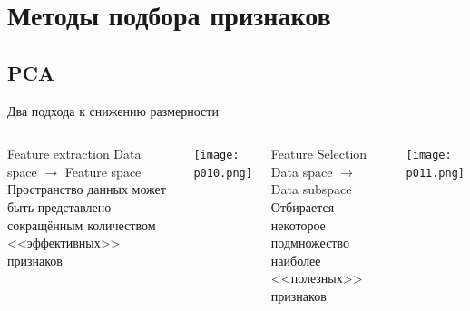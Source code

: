 \documentclass[pdf, intlimits, 9pt, unicode]{beamer}
\begin{document}

\section{Методы подбора признаков}
\subsection{PCA}



\begin{frame}{Два подхода к снижению размерности}

\begin{columns}[t] %
\begin{block}{Feature extraction}
Data space $\rightarrow$ Feature space\\
Пространство данных может быть представлено сокращённым количеством <<эффективных>> признаков
\end{block}
\texttt{[image: p010.png]}\pause

\begin{block}{Feature Selection}
Data space $\rightarrow$ Data subspace\\
Отбирается некоторое подмножество наиболее <<полезных>> признаков
\end{block}
\texttt{[image: p011.png]}
\end{columns}
\end{frame}
\end{document}
